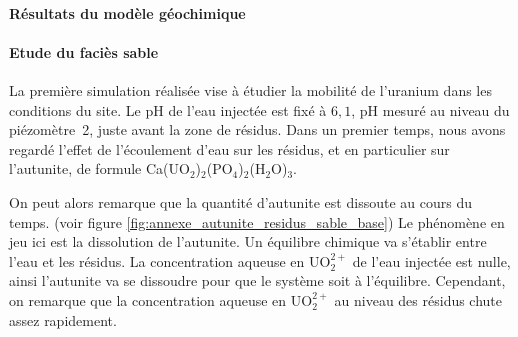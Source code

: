 \documentclass{article}
\begin{document}
\paragraph{Résultats du modèle géochimique }

\paragraph{Etude du faciès sable}
La première simulation réalisée vise à étudier la mobilité de l’uranium dans les conditions du site. Le pH de l’eau injectée est fixé à $6,1$, pH mesuré au niveau du piézomètre~2, juste avant la zone de résidus. Dans un premier temps, nous avons regardé l’effet de l’écoulement d’eau sur les résidus, et en particulier sur l’autunite, de formule Ca(UO$_2$)$_2$(PO$_4$)$_2$(H$_2$O)$_3$.



On peut alors remarque que la quantité d’autunite est dissoute au cours du temps. (voir figure \ref{fig:annexe_autunite_residus_sable_base}) Le phénomène en jeu ici est la dissolution de l’autunite. Un équilibre chimique va s’établir entre l’eau et les résidus. La concentration aqueuse en UO$_2^{2+}$ de l’eau injectée est nulle, ainsi l’autunite va se dissoudre pour que le système soit à l’équilibre. Cependant, on remarque que la concentration aqueuse en UO$_2^{2+}$ au niveau des résidus chute assez rapidement.
\end{document}
